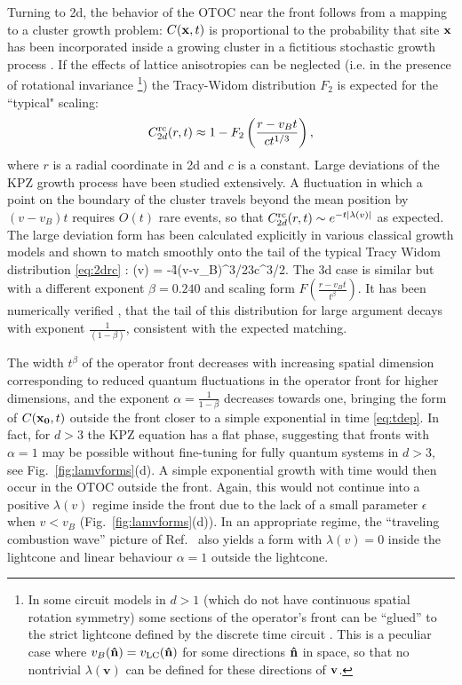 \documentclass[aps,prl,reprint,superscriptaddress, longbibliography]{revtex4-1}
\newcommand{\vb}{v_B}
\begin{document}
Turning to 2d, the  behavior of the OTOC near the front follows from a mapping to a cluster growth problem: $C({\bf x},t)$ is proportional to the probability that site ${\bf x}$ has been incorporated inside a growing cluster in a fictitious stochastic growth process \cite{opspreadAdam}. If the effects of lattice anisotropies can be neglected (i.e. in the presence of  rotational invariance
\footnote{{In some circuit models in $d>1$ (which do not have continuous spatial rotation symmetry) some sections of the operator's front can be ``glued'' to the strict lightcone defined by the discrete time circuit \cite{opspreadAdam}. This is a peculiar case where ${v_B( {\bf \hat n} ) = v_\text{LC}( {\bf \hat n})}$ for some directions ${\bf \hat n}$ in space, so that no nontrivial  $\lambda({\mathbf v})$ can be defined for these directions of ${\bf v}$.}}) the Tracy-Widom distribution $F_2$ is expected for the ``typical" scaling:
\begin{align}
C_{2d}^{\rm rc}(r,t) \approx 1- F_2 \left( \frac{r-\vb t}{ ct^{1/3 }} \right) ,
\label{eq:2drc}
\end{align}
where $r$ is a radial coordinate in 2d and $c$ is a constant. 
Large deviations  of the KPZ growth process \cite{MajumdarKPZTail, MonthusKPZNumerics,KolokolovKPZtails} have been studied extensively.  A fluctuation in which a point on the boundary of the cluster travels beyond the mean position by $(v-v_B)t$ requires $O(t)$ rare events, so that $C_{2d}^{\rm rc}(r,t)\sim e^{-t|\lambda(v)|}$ as expected.  The large deviation form has been calculated explicitly in various classical growth models and shown to match smoothly onto the tail of the typical Tracy Widom distribution \eqref{eq:2drc} \cite{MajumdarKPZTail}:
\be\label{eq:2plus1lambda}
\lambda(v) = -\f{4(v-\vb)^{3/2}}{3c^{3/2}}.
\ee
The 3d case is similar but with a different exponent $\beta = 0.240$ \cite{KPZ_2d_exponent} and scaling form $F\left(\frac{r-\vb t}{t^\beta}\right)$.
It has been numerically verified  \cite{MonthusKPZNumerics,KPZcocktail}, that the tail of this distribution  for large argument decays with exponent $\frac{1}{(1-\beta)}$, consistent with the expected matching.


The  width $t^\beta$ of the operator front  decreases with increasing spatial dimension  corresponding to reduced quantum
fluctuations in the operator front for higher dimensions,
and the exponent $\alpha = \frac{1}{1-\beta}$ decreases towards one, bringing the  form of $C({\bf x_0},t)$ outside the front closer to a simple exponential in time \eqref{eq:tdep}.  In fact, for $d>3$ the  KPZ equation  has a flat phase, suggesting that fronts with $\alpha = 1$ may be possible without fine-tuning for fully quantum systems in $d>3$, see Fig.~\ref{fig:lamvforms}(d). A simple exponential growth with time would then occur in the OTOC outside the front.
Again, this would not continue into a positive $\lambda(v)$ regime inside the front due to the lack of a small parameter $\epsilon$ when $v < \vb$ (Fig.~\ref{fig:lamvforms}(d)). In an appropriate regime, the ``traveling combustion wave'' picture of Ref.~\cite{AleinerOTOC}
also yields  a form with $\lambda(v) = 0$ inside the lightcone and linear behaviour $\alpha=1$ outside the lightcone. 
\end{document}
